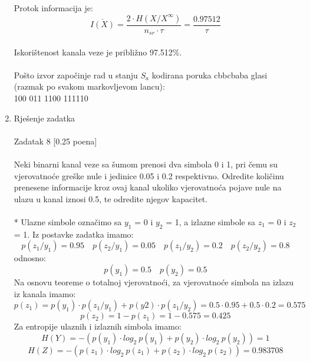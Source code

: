 \documentclass[12pt]{article}
\begin{document}
\begin{enumerate}
\begin{equation*}
 \end{equation*}
 Protok informacija je:
 \begin{equation*}
    \overline{I(X)} = \frac{2 \cdot H(X/X^\infty)}{n_{sr} \cdot \tau} = \frac{0.97512}{\tau}
\end{equation*}
\\
Iskorištenost kanala veze je približno 97.512\%. \\
\\
Pošto izvor započinje rad u stanju $S_a$ kodirana poruka cbbcbaba glasi (razmak po svakom markovljevom lancu):\\ 
100 011 1100 111110 \\
		\item Rješenje zadatka \\
		\\
		Zadatak 8 [0.25 poena] \\
        \\
Neki binarni kanal veze sa šumom prenosi dva simbola 0 i 1, pri čemu su vjerovatnoće greške nule i jedinice 0.05 i 0.2 respektivno. Odredite količinu prenesene informacije kroz ovaj kanal ukoliko vjerovatnoća pojave nule na ulazu u kanal iznosi 0.5, te odredite njegov kapacitet. \\
\\
* Ulazne simbole označimo sa $y_1$ = 0 i $y_2$ = 1, a izlazne simbole sa $z_1$ = 0 i
$z_2$ = 1. Iz postavke zadatka imamo:
\begin{equation*}
    p(z_1/y_1) = 0.95 \quad p(z_2/y_1) = 0.05 \quad p(z_1/y_2) = 0.2 \quad p(z_2/y_2) = 0.8
\end{equation*}
odnosno:
\begin{equation*}
    p(y_1) = 0.5 \quad p(y_2) = 0.5
\end{equation*}
Na osnovu teoreme o totalnoj vjerovatnoći, za vjerovatnoće simbola na
izlazu iz kanala imamo:
\begin{equation*}
    p(z_1) = p(y_1) \cdot p(z_1/y_1) + p(y2)\cdot p(z_1/y_2) =  0.5 \cdot 0.95 + 0.5 \cdot 0.2 = 0.575
\end{equation*}
\begin{equation*}
    p(z_2) = 1 - p(z_1) = 1 - 0.575 = 0.425
\end{equation*}
Za entropije ulaznih i izlaznih simbola imamo:
\begin{equation*}
    H(Y) = -(p(y_1) \cdot log_2~p(y_1) + p(y_2) \cdot log_2~p(y_2)) = 1
\end{equation*}
\begin{equation*}
    H(Z) = -(p(z_1) \cdot log_2~p(z_1) + p(z_2) \cdot log_2~p(z_2)) = 0.983708

\end{equation*}
\end{enumerate}
\end{document}
